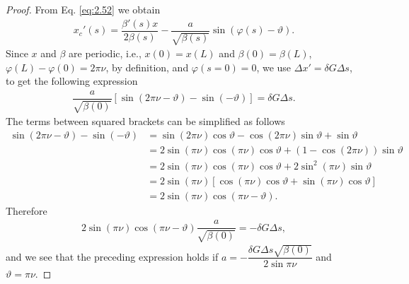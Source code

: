 \begin{proof}
From Eq. \eqref{eq:2.52} we obtain
\begin{align*}
x_c'(s) =\dfrac{\beta'(s)x}{2\beta(s)} - \dfrac{a}{\sqrt{\beta(s)}}\sin\left(\varphi(s) - \vartheta\right).
\end{align*}
Since $x$ and $\beta$ are periodic, i.e., $x(0)=x(L)$ and $\beta(0) = \beta(L)$, $\varphi(L) - \varphi(0) = 2 \pi \nu$, by definition, and $\varphi(s=0)=0$, we use $\Delta x' =  \delta G \Delta s$,
to get the following expression
\begin{align*}
\dfrac{a}{\sqrt{\beta(0)}}\left[\sin(2\pi \nu - \vartheta) - \sin(-\vartheta)\right] = \delta G \Delta s.
\end{align*}
The terms between squared brackets can be simplified as follows
\begin{align*}
\sin(2\pi \nu - \vartheta) - \sin(-\vartheta) &= \sin(2\pi \nu)\cos\vartheta - \cos(2\pi \nu)\sin \vartheta + \sin \vartheta\\
                                         &= 2\sin(\pi \nu)\cos(\pi \nu)\cos\vartheta + \left(1-\cos(2\pi \nu)\right)\sin\vartheta\\
                                           &= 2\sin(\pi \nu)\cos(\pi \nu)\cos\vartheta + 2\sin^2(\pi \nu)\sin\vartheta\\
                                           &= 2\sin(\pi\nu)\left[\cos(\pi\nu)\cos\vartheta + \sin(\pi\nu)\cos\vartheta\right] \\
                                           &=  2\sin(\pi\nu)\cos(\pi\nu - \vartheta).
\end{align*}
Therefore
\begin{align*}
2\sin(\pi\nu)\cos(\pi\nu - \vartheta)\dfrac{a}{\sqrt{\beta(0)}} = -\delta G \Delta s,
\end{align*}
and we see that the preceding expression holds if $a = -\dfrac{\delta G \Delta s \sqrt{\beta(0)}}{2 \sin \pi \nu}$ and $\vartheta = \pi \nu$.
\end{proof}

